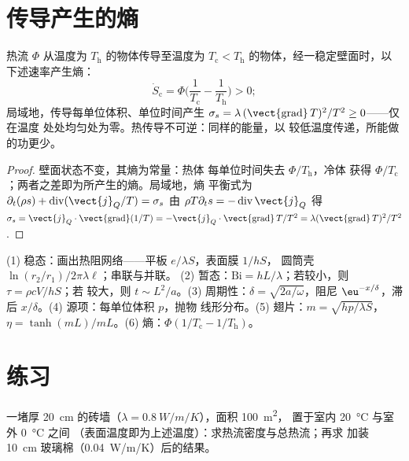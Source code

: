 \section{传导产生的熵}

\begin{proposition}[熵的产生]\label{prop:b2:heat-conduction:entropy}
热流 $\Phi$ 从温度为 $T_{\text{h}}$ 的物体传导至温度为
$T_{\text{c}} < T_{\text{h}}$ 的物体，经一稳定壁面时，以
下述速率产生熵：
\[
\dot S_{\text{c}} = \Phi\Big(\frac{1}{T_{\text{c}}} - \frac{1}{T_{\text{h}}}\Big) > 0 ;
\]
局域地，传导每单位体积、单位时间产生 $\sigma_s = \lambda\,(\vect{\operatorname{grad}}\,T)^2/T^2
\ge 0$——仅在温度
处处均匀处为零。热传导不可逆：同样的能量，以
较低温度传递，所能做的功更少。
\end{proposition}

\begin{proof}
壁面状态不变，其熵为常量：热体
每单位时间失去 $\Phi/T_{\text{h}}$，冷体
获得 $\Phi/T_{\text{c}}$；两者之差即为所产生的熵。局域地，熵
平衡式为 $\partial_t(\rho s) + \operatorname{div}(\vect{j}_Q/T) = \sigma_s$
由 $\rho T\partial_t s = -\operatorname{div}\vect{j}_Q$ 得 $\sigma_s =
\vect{j}_Q\cdot\vect{\operatorname{grad}}(1/T) = -\vect{j}_Q\cdot
\vect{\operatorname{grad}}\,T/T^2 = \lambda(\vect{\operatorname{grad}}\,T)^2/T^2$.
\end{proof}

\begin{method}[传导估算]\label{meth:b2:heat-conduction:method}
(1) 稳态：画出热阻网络——平板 $e/\lambda S$，表面膜 $1/hS$，
圆筒壳 $\ln(r_2/r_1)/2\pi\lambda\ell$；串联与并联。
(2) 暂态：$\mathrm{Bi} = hL/\lambda$；若较小，则 $\tau = \rho cV/hS$；若
较大，则 $t \sim L^2/a$。(3) 周期性：$\delta = \sqrt{2a/\omega}$，阻尼
$\eu^{-x/\delta}$，滞后 $x/\delta$。(4) 源项：每单位体积 $p$，抛物
线形分布。(5) 翅片：$m = \sqrt{hp/\lambda S}$，$\eta = \tanh(mL)/mL$。(6)
熵：$\Phi(1/T_{\text{c}} - 1/T_{\text{h}})$。
\end{method}

\section{练习}

\begin{exercise}[$\star$]\label{exo:b2:heat-conduction:1}
一堵厚 \qty{20}{cm} 的砖墙（$\lambda = \qty{0.8}{W/m/K}$），面积 \qty{100}{m^2}，
置于室内 \qty{20}{\celsius} 与室外 \qty{0}{\celsius} 之间
（表面温度即为上述温度）：求热流密度与总热流；再求
加装 \qty{10}{cm} 玻璃棉（\qty{0.04}{W/m/K}）后的结果。
\end{exercise}

